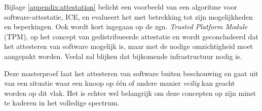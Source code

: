 Bijlage \ref{appendix:attestation} belicht een voorbeeld van een algoritme voor
software-attestatie, ICE, en evalueert het met betrekking tot zijn
mogelijkheden en beperkingen. Ook wordt kort ingegaan op de zgn. \emph{Trusted
Platform Module} (TPM), op het concept van gedistribueerde attestatie en wordt
geconcludeerd dat het attesteren van software mogelijk is, maar met de nodige
omzichtigheid moet aangepakt worden. Veelal zal blijken dat bijkomende
infrastructuur nodig is.

Deze masterproef laat het attesteren van software buiten beschouwing en gaat
uit van een situatie waar een knoop op \'e\'en of andere manier \emph{veilig}
kan geacht worden op dit vlak. Het is echter wel belangrijk om deze concepten
op zijn minst te kaderen in het volledige spectrum.
